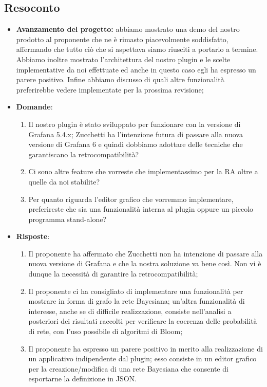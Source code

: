 \subsection{Resoconto}
\begin{itemize}
	\item \textbf{Avanzamento del progetto:} abbiamo mostrato una demo del nostro prodotto al proponente che ne è rimasto piacevolmente soddisfatto, affermando che tutto ciò che si aspettava siamo riusciti a portarlo a termine. Abbiamo inoltre mostrato l'architettura del nostro plugin e le scelte implementative da noi effettuate ed anche in questo caso egli ha espresso un parere positivo. Infine abbiamo discusso di quali altre funzionalità preferirebbe vedere implementate per la prossima revisione;
	\item {\textbf{Domande}:
		\begin{enumerate}
			\item Il nostro plugin è stato sviluppato per funzionare con la versione di Grafana 5.4.x; Zucchetti ha l'intenzione futura di passare alla nuova versione di Grafana 6 e quindi dobbiamo adottare delle tecniche che garantiscano la retrocompatibilità?
			\item Ci sono altre feature che vorreste che implementassimo per la RA oltre a quelle da noi stabilite?
			\item Per quanto riguarda l'editor grafico che vorremmo implementare, preferireste che sia una funzionalità interna al plugin oppure un piccolo programma stand-alone?
		\end{enumerate}}
	\item {\textbf{Risposte}:
		\begin{enumerate}
			\item Il proponente ha affermato che Zucchetti non ha intenzione di passare alla nuova versione di Grafana e che la nostra soluzione va bene così. Non vi è dunque la necessità di garantire la retrocompatibilità;
			\item Il proponente ci ha consigliato di implementare una funzionalità per mostrare in forma di grafo la rete Bayesiana; un'altra funzionalità di interesse, anche se di difficile realizzazione, consiste nell'analisi a posteriori dei risultati raccolti per verificare la coerenza delle probabilità di rete, con l'uso possibile di algoritmi di Bloom;
			\item Il proponente ha espresso un parere positivo in merito alla realizzazione di un applicativo indipendente dal plugin; esso consiste in un editor grafico per la creazione/modifica di una rete Bayesiana che consente di esportarne la definizione in JSON.
		\end{enumerate}}
\end{itemize}

